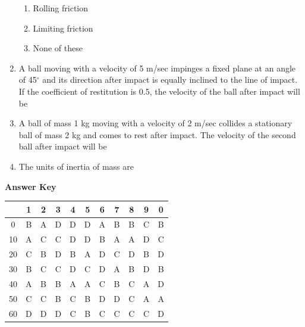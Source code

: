 \documentclass[11pt,a4paper]{article}
\begin{document}
\begin{enumerate}
\begin{enumerate}[label=\Alph*.]
\item{Rolling friction}
\item{Limiting friction}
\item{None of these}
\end{enumerate}
\item{A ball moving with a velocity of 5 m/sec impinges a fixed plane at an angle of 45$^\circ$ and its direction after impact is equally inclined to the line of impact. If the coefficient of restitution is 0.5, the velocity of the ball after impact will be
}
\\
\item{A ball of mass 1 kg moving with a velocity of 2 m/sec collides a stationary ball of mass 2 kg and comes to rest after impact. The velocity of the second ball after impact will be}
\\
\item{The units of inertia of mass are}
\\
\end{enumerate}
\textbf{Answer Key}
\begin{tabular}{ | c | c c c c c c c c c c | }
\hline
 & 1 & 2 & 3 & 4 & 5 & 6 & 7 & 8 & 9 & 0 \\
\hline
0 & B & A & D & D & D & A & B & B & C & B \\
10 & A & C & C & D & D & B & A & A & D & C \\
20 & C & B & D & B & A & D & C & D & B & D \\
30 & B & C & C & D & C & D & A & B & D & B \\
40 & A & B & B & A & A & C & B & C & A & D \\
50 & C & C & B & C & B & D & D & C & A & A \\
60 & D & D & D & C & B & C & C & C & C & D \\
\hline
\end{tabular}
\clearpage
\end{document}
